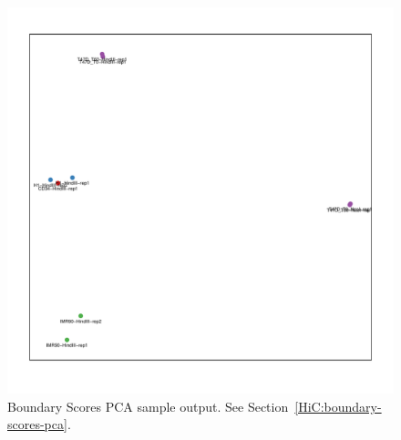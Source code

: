 \begin{figure}[!htb]%
    \centering
    \includegraphics[width=\textwidth,height=\textheight,keepaspectratio]{figure/boundary-scores-pca_pca_DI_k_001}
    \caption{Boundary Scores PCA sample output. See Section~\ref{HiC:boundary-scores-pca}.} %
    \label{fig:boundary-scores-pca_DI_k_001}
\end{figure}
\clearpage
